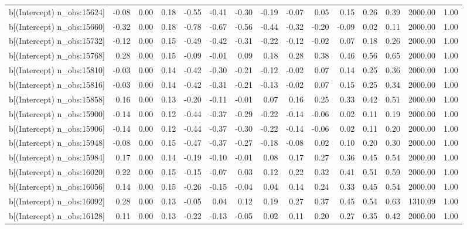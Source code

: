 \begin{table}[ht]
\begin{tabular}{rrrrrrrrrrrrrrr}
  b[(Intercept) n\_obs:15624] & -0.08 & 0.00 & 0.18 & -0.55 & -0.41 & -0.30 & -0.19 & -0.07 & 0.05 & 0.15 & 0.26 & 0.39 & 2000.00 & 1.00 \\ 
  b[(Intercept) n\_obs:15660] & -0.32 & 0.00 & 0.18 & -0.78 & -0.67 & -0.56 & -0.44 & -0.32 & -0.20 & -0.09 & 0.02 & 0.11 & 2000.00 & 1.00 \\ 
  b[(Intercept) n\_obs:15732] & -0.12 & 0.00 & 0.15 & -0.49 & -0.42 & -0.31 & -0.22 & -0.12 & -0.02 & 0.07 & 0.18 & 0.26 & 2000.00 & 1.00 \\ 
  b[(Intercept) n\_obs:15768] & 0.28 & 0.00 & 0.15 & -0.09 & -0.01 & 0.09 & 0.18 & 0.28 & 0.38 & 0.46 & 0.56 & 0.65 & 2000.00 & 1.00 \\ 
  b[(Intercept) n\_obs:15810] & -0.03 & 0.00 & 0.14 & -0.42 & -0.30 & -0.21 & -0.12 & -0.02 & 0.07 & 0.14 & 0.25 & 0.36 & 2000.00 & 1.00 \\ 
  b[(Intercept) n\_obs:15816] & -0.03 & 0.00 & 0.14 & -0.42 & -0.31 & -0.21 & -0.13 & -0.02 & 0.07 & 0.15 & 0.25 & 0.34 & 2000.00 & 1.00 \\ 
  b[(Intercept) n\_obs:15858] & 0.16 & 0.00 & 0.13 & -0.20 & -0.11 & -0.01 & 0.07 & 0.16 & 0.25 & 0.33 & 0.42 & 0.51 & 2000.00 & 1.00 \\ 
  b[(Intercept) n\_obs:15900] & -0.14 & 0.00 & 0.12 & -0.44 & -0.37 & -0.29 & -0.22 & -0.14 & -0.06 & 0.02 & 0.11 & 0.19 & 2000.00 & 1.00 \\ 
  b[(Intercept) n\_obs:15906] & -0.14 & 0.00 & 0.12 & -0.44 & -0.37 & -0.30 & -0.22 & -0.14 & -0.06 & 0.02 & 0.11 & 0.20 & 2000.00 & 1.00 \\ 
  b[(Intercept) n\_obs:15948] & -0.08 & 0.00 & 0.15 & -0.47 & -0.37 & -0.27 & -0.18 & -0.08 & 0.02 & 0.10 & 0.20 & 0.30 & 2000.00 & 1.00 \\ 
  b[(Intercept) n\_obs:15984] & 0.17 & 0.00 & 0.14 & -0.19 & -0.10 & -0.01 & 0.08 & 0.17 & 0.27 & 0.36 & 0.45 & 0.54 & 2000.00 & 1.00 \\ 
  b[(Intercept) n\_obs:16020] & 0.22 & 0.00 & 0.15 & -0.15 & -0.07 & 0.03 & 0.12 & 0.22 & 0.32 & 0.41 & 0.51 & 0.59 & 2000.00 & 1.00 \\ 
  b[(Intercept) n\_obs:16056] & 0.14 & 0.00 & 0.15 & -0.26 & -0.15 & -0.04 & 0.04 & 0.14 & 0.24 & 0.33 & 0.45 & 0.54 & 2000.00 & 1.00 \\ 
  b[(Intercept) n\_obs:16092] & 0.28 & 0.00 & 0.13 & -0.05 & 0.04 & 0.12 & 0.19 & 0.27 & 0.37 & 0.45 & 0.54 & 0.63 & 1310.09 & 1.00 \\ 
  b[(Intercept) n\_obs:16128] & 0.11 & 0.00 & 0.13 & -0.22 & -0.13 & -0.05 & 0.02 & 0.11 & 0.20 & 0.27 & 0.35 & 0.42 & 2000.00 & 1.00 \\ 

\end{tabular}
\end{table}
